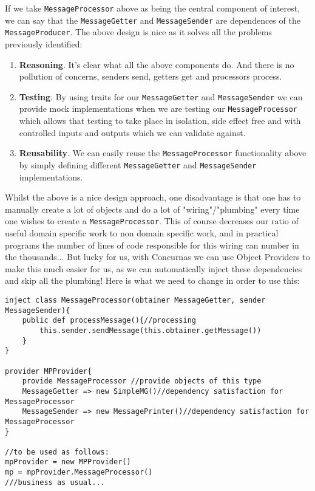 \documentclass[conc-doc]{subfiles}
\begin{document}
If we take \lstinline{MessageProcessor} above as being the central component of interest, we can say that the \lstinline{MessageGetter} and \lstinline{MessageSender} are dependences of the \lstinline{MessageProducer}. The above design is nice as it solves all the problems previously identified:
\begin{enumerate}
	\item \textbf{Reasoning}. It's clear what all the above components do. And there is no pollution of concerns, senders send, getters get and processors process.
	\item \textbf{Testing}. By using traits for our \lstinline{MessageGetter} and \lstinline{MessageSender} we can provide mock implementations when we are testing our \lstinline{MessageProcessor} which allows that testing to take place in isolation, side effect free and with controlled inputs and outputs which we can validate against.
	\item \textbf{Reusability}. We can easily reuse the \lstinline{MessageProcessor} functionality above by simply defining different \lstinline{MessageGetter} and \lstinline{MessageSender} implementations.
\end{enumerate}

Whilst the above is a nice design approach, one disadvantage is that one has to manually create a lot of objects and do a lot of "wiring"/"plumbing" every time one wishes to create a \lstinline{MessageProcessor}. This of course decreases our ratio of useful domain specific work to non domain specific work, and in practical programs the number of lines of code responsible for this wiring can number in the thousands... But lucky for us, with Concurnas we can use Object Providers to make this much easier for us, as we can automatically inject these dependencies and skip all the plumbing! Here is what we need to change in order to use this:

\begin{lstlisting}
inject class MessageProcessor(obtainer MessageGetter, sender MessageSender){
	public def processMessage(){//processing
		this.sender.sendMessage(this.obtainer.getMessage())
	}
}

provider MPProvider{
	provide MessageProcessor //provide objects of this type
	MessageGetter => new SimpleMG()//dependency satisfaction for MessageProcessor 
	MessageSender => new MessagePrinter()//dependency satisfaction for MessageProcessor
}

//to be used as follows:
mpProvider = new MPProvider()
mp = mpProvider.MessageProcessor()
///business as usual...
\end{lstlisting}
\end{document}
